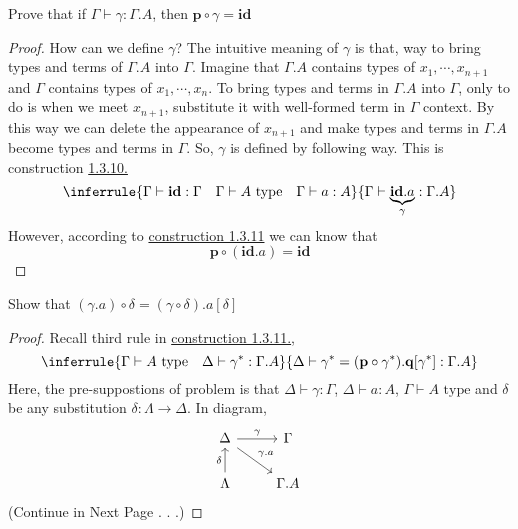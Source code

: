 \documentclass[12pt, a4paper, openany, twoside]{book}
\theoremstyle{definition}
\theoremstyle{remark}
\theoremstyle{plain}
\numberwithin{equation}{section}
\begin{document}
\begin{tcolorbox}[colback=yellow!10!white,colframe=brown!75!black,title=Exercise 2.1]

Prove that if $\Gamma \vdash \gamma : \Gamma.A$, then $\mathbf{p} \circ \gamma = \textbf{id}$
\begin{proof}
    How can we define $\gamma$? The intuitive meaning of $\gamma$ is that, way to bring types and terms 
    of $\Gamma.A$ into $\Gamma$. Imagine that $\Gamma.A$ contains types of $x_1, \cdots, x_{n+1}$ and 
    $\Gamma$ contains types of $x_1, \cdots, x_n$. To bring types and terms in $\Gamma.A$ into $\Gamma$, only to do is when we meet $x_{n+1}$, substitute it with well-formed term in $\Gamma$ context. 
    By this way we can delete the appearance of $x_{n+1}$ and make types and terms in $\Gamma.A$ become types and terms in $\Gamma$. 
    So, $\gamma$ is defined by following way. This is construction \hyperlink{subst extend}{1.3.10.}
    \[
    \inferrule
    {\Gamma \vdash \textbf{id} : \Gamma \quad \Gamma \vdash A \text{ type} \quad \Gamma \vdash a : A}
    {\Gamma \vdash \underbrace{\textbf{id}.a}_{\gamma} : \Gamma.A}
    \]
    However, according to \hyperlink{construction 1.3.11}{construction 1.3.11} we can know that 
    \[\mathbf{p} \circ (\mathbf{id}.a) = \mathbf{id}\]
\end{proof}
\end{tcolorbox}

\begin{tcolorbox}[colback=yellow!10!white,colframe=brown!75!black,title=Exercise 2.2]
Show that $(\gamma.a) \circ \delta = (\gamma \circ \delta).a[\delta]$

\begin{proof}
    Recall third rule in \hyperlink{construction 1.3.11}{construction 1.3.11.}, 
    \[
    \inferrule
    {\Gamma \vdash A \text{ type} \quad \Delta \vdash \gamma^* : \Gamma.A}
    {\Delta \vdash \gamma^* = (\mathbf{p}\circ \gamma^*).\mathbf{q}[\gamma^*] : \Gamma.A}
    \]
    Here, the pre-suppostions of problem is that $\Delta \vdash \gamma : \Gamma$, $\Delta \vdash a : A$, $\Gamma \vdash A \text{ type}$ and $\delta$ be any substitution $\delta : \Lambda \rightarrow \Delta$. 
    In diagram, 
    \[
    \begin{tikzcd}
        \Delta \arrow[r, "\gamma"] \arrow[rd, "\gamma.a"] & \Gamma \\
        \Lambda \arrow[u, "\delta"] & \Gamma.A
    \end{tikzcd}
    \]
    (Continue in Next Page . . .)
\end{proof}
\end{tcolorbox}
\end{document}
